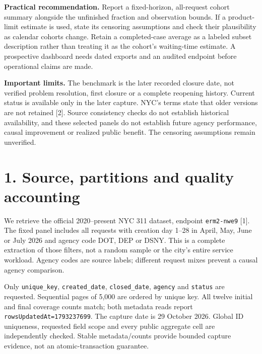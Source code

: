 \documentclass[10pt,letterpaper]{article}
\begin{document}
\textbf{Practical recommendation.} Report a fixed-horizon, all-request cohort summary alongside the unfinished fraction and observation bounds. If a product-limit estimate is used, state its censoring assumptions and check their plausibility as calendar cohorts change. Retain a completed-case average as a labeled subset description rather than treating it as the cohort's waiting-time estimate. A prospective dashboard needs dated exports and an audited endpoint before operational claims are made.

\textbf{Important limits.} The benchmark is the later recorded closure date, not verified problem resolution, first closure or a complete reopening history. Current status is available only in the later capture. NYC's terms state that older versions are not retained [2]. Source consistency checks do not establish historical availability, and these selected panels do not establish future agency performance, causal improvement or realized public benefit. The censoring assumptions remain unverified.

\clearpage
\section*{1. Source, partitions and quality accounting}
We retrieve the official 2020--present NYC 311 dataset, endpoint \texttt{erm2-nwe9} [1]. The fixed panel includes all requests with creation day 1--28 in April, May, June or July 2026 and agency code DOT, DEP or DSNY. This is a complete extraction of those filters, not a random sample or the city's entire service workload. Agency codes are source labels; different request mixes prevent a causal agency comparison.

Only \texttt{unique\_key}, \texttt{created\_date}, \texttt{closed\_date}, \texttt{agency} and \texttt{status} are requested. Sequential pages of 5,000 are ordered by unique key. All twelve initial and final coverage counts match; both metadata reads report \texttt{rowsUpdatedAt=1793237699}. The capture date is 29 October 2026. Global ID uniqueness, requested field scope and every public aggregate cell are independently checked. Stable metadata/counts provide bounded capture evidence, not an atomic-transaction guarantee.
\end{document}
